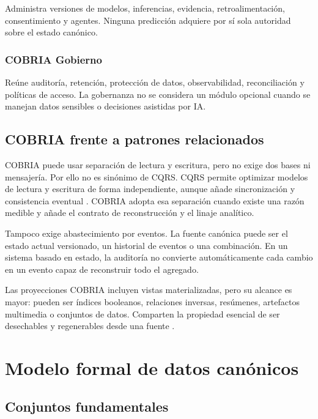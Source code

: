 Administra versiones de modelos, inferencias, evidencia, retroalimentación, consentimiento y
agentes. Ninguna predicción adquiere por sí sola autoridad sobre el estado canónico.

\subsection{COBRIA Gobierno}

Reúne auditoría, retención, protección de datos, observabilidad, reconciliación y
políticas de acceso. La gobernanza no se considera un módulo opcional cuando se manejan
datos sensibles o decisiones asistidas por IA.

\section{COBRIA frente a patrones relacionados}

COBRIA puede usar separación de lectura y escritura, pero no exige dos bases ni
mensajería. Por ello no es sinónimo de CQRS. CQRS permite optimizar modelos de lectura y
escritura de forma independiente, aunque añade sincronización y consistencia eventual
\parencite{microsoft2025cqrs}. COBRIA adopta esa separación cuando existe una razón
medible y añade el contrato de reconstrucción y el linaje analítico.

Tampoco exige abastecimiento por eventos. La fuente canónica puede ser el estado actual versionado,
un historial de eventos o una combinación. En un sistema basado en estado, la auditoría
no convierte automáticamente cada cambio en un evento capaz de reconstruir todo el
agregado.

Las proyecciones COBRIA incluyen vistas materializadas, pero su alcance es mayor: pueden
ser índices booleanos, relaciones inversas, resúmenes, artefactos multimedia o conjuntos de datos.
Comparten la propiedad esencial de ser desechables y regenerables desde una fuente
\parencite{microsoft2025materialized,gupta1995materialized}.

\chapter{Modelo formal de datos canónicos}
\label{ch:modelo-formal}

\section{Conjuntos fundamentales}

